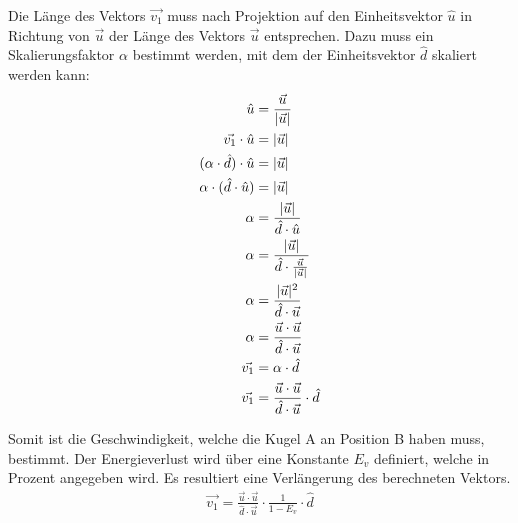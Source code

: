 Die Länge des Vektors $\vec{v_1}$ muss nach Projektion auf den Einheitsvektor $\hat{u}$ in Richtung
von $\vec{u}$ der Länge des Vektors $\vec{u}$ entsprechen. Dazu muss ein Skalierungsfaktor $\alpha$ bestimmt werden,
mit dem der Einheitsvektor $\hat{d}$ skaliert werden kann:
\begin{align}
    \hat{u} &= \frac{\vec{u}}{\lvert \vec{u} \rvert}\\
    \vec{v_1} \cdot \hat{u} &= \lvert \vec{u} \rvert\\
    (\alpha \cdot \hat{d}) \cdot \hat{u} &= \lvert \vec{u} \rvert\\
    \alpha \cdot (\hat{d} \cdot \hat{u}) &= \lvert \vec{u} \rvert\\
    \alpha &= \frac{\lvert \vec{u} \rvert}{\hat{d} \cdot \hat{u}}\\
    \alpha &= \frac{\lvert \vec{u} \rvert}{\hat{d} \cdot \frac{\vec{u}}{\lvert \vec{u} \rvert}}\\
    \alpha &= \frac{\lvert \vec{u} \rvert^2}{\hat{d} \cdot \vec{u}}\\
    \alpha &= \frac{\vec{u} \cdot \vec{u}}{\hat{d} \cdot \vec{u}}\\
    \vec{v_1} &= \alpha \cdot \hat{d}\\
    \vec{v_1} &= \frac{\vec{u} \cdot \vec{u}}{\hat{d} \cdot \vec{u}} \cdot \hat{d}
\end{align}

Somit ist die Geschwindigkeit, welche die Kugel A an Position B haben muss, bestimmt.
Der Energieverlust wird über eine Konstante $E_v$ definiert, welche in Prozent angegeben wird.
Es resultiert eine Verlängerung des berechneten Vektors.
\begin{align}
    \vec{v_1} = \frac{\vec{u} \cdot \vec{u}}{\hat{d} \cdot \vec{u}} \cdot \frac{1}{1 - E_v} \cdot \hat{d}
\end{align}